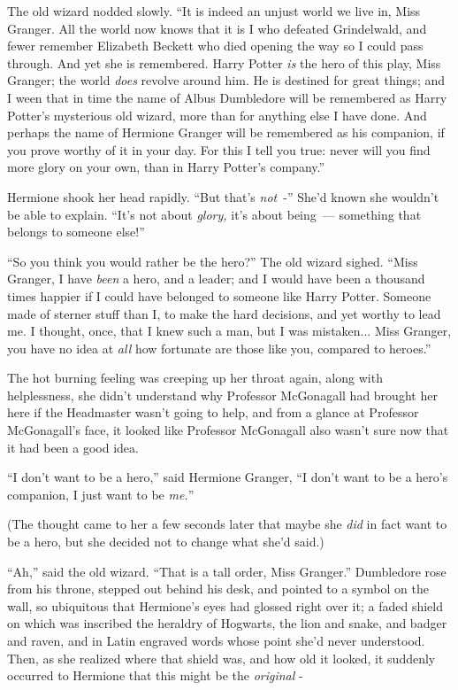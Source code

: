 The old wizard nodded slowly. ``It is indeed an unjust world we live in, Miss Granger. All the world now knows that it is I who defeated Grindelwald, and fewer remember Elizabeth Beckett who died opening the way so I could pass through. And yet she is remembered. Harry Potter \emph{is} the hero of this play, Miss Granger; the world \emph{does} revolve around him. He is destined for great things; and I ween that in time the name of Albus Dumbledore will be remembered as Harry Potter's mysterious old wizard, more than for anything else I have done. And perhaps the name of Hermione Granger will be remembered as his companion, if you prove worthy of it in your day. For this I tell you true: never will you find more glory on your own, than in Harry Potter's company.''

Hermione shook her head rapidly. ``But that's \emph{not}~-'' She'd known she wouldn't be able to explain. ``It's not about \emph{glory,} it's about being~--- something that belongs to someone else!''

``So you think you would rather be the hero?'' The old wizard sighed. ``Miss Granger, I have \emph{been} a hero, and a leader; and I would have been a thousand times happier if I could have belonged to someone like Harry Potter. Someone made of sterner stuff than I, to make the hard decisions, and yet worthy to lead me. I thought, once, that I knew such a man, but I was mistaken... Miss Granger, you have no idea at \emph{all} how fortunate are those like you, compared to heroes.''

The hot burning feeling was creeping up her throat again, along with helplessness, she didn't understand why Professor McGonagall had brought her here if the Headmaster wasn't going to help, and from a glance at Professor McGonagall's face, it looked like Professor McGonagall also wasn't sure now that it had been a good idea.

``I don't want to be a hero,'' said Hermione Granger, ``I don't want to be a hero's companion, I just want to be \emph{me.}''

(The thought came to her a few seconds later that maybe she \emph{did} in fact want to be a hero, but she decided not to change what she'd said.)

``Ah,'' said the old wizard. ``That is a tall order, Miss Granger.'' Dumbledore rose from his throne, stepped out behind his desk, and pointed to a symbol on the wall, so ubiquitous that Hermione's eyes had glossed right over it; a faded shield on which was inscribed the heraldry of Hogwarts, the lion and snake, and badger and raven, and in Latin engraved words whose point she'd never understood. Then, as she realized where that shield was, and how old it looked, it suddenly occurred to Hermione that this might be the \emph{original} -

